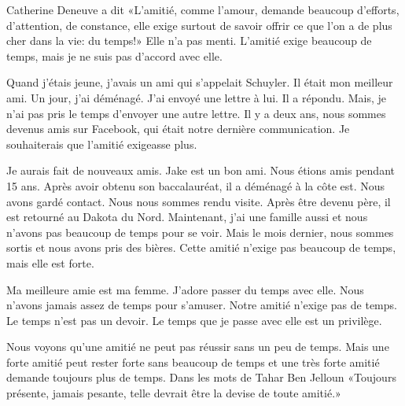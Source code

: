 \documentclass[letterpaper]{article}
\begin{document}
\doublespacing
Catherine Deneuve a dit «L'amitié, comme l'amour, demande beaucoup d'efforts, d'attention, de constance, elle exige surtout de savoir offrir ce que l'on a de plus cher dans la vie: du temps!»
Elle n'a pas menti.
L'amitié exige beaucoup de temps, mais je ne suis pas d'accord avec elle.

Quand j'étais jeune, j'avais un ami qui s'appelait Schuyler.
Il était mon meilleur ami.
Un jour, j'ai déménagé.
J'ai envoyé une lettre à lui.
Il a répondu.
Mais, je n'ai pas pris le temps d'envoyer une autre lettre.
Il y a deux ans, nous sommes devenus amis sur Facebook, qui était notre dernière communication.
Je souhaiterais que l'amitié exigeasse plus.

Je aurais fait de nouveaux amis.
Jake est un bon ami.
Nous étions amis pendant 15 ans.
Après avoir obtenu son baccalauréat, il a déménagé à la côte est.
Nous avons gardé contact.
Nous nous sommes rendu visite.
Après être devenu père, il est retourné au Dakota du Nord.
Maintenant, j'ai une famille aussi et nous n'avons pas beaucoup de temps pour se voir.
Mais le mois dernier, nous sommes sortis et nous avons pris des bières.
Cette amitié n'exige pas beaucoup de temps, mais elle est forte.

Ma meilleure amie est ma femme.
J'adore passer du temps avec elle.
Nous n'avons jamais assez de temps pour s'amuser.
Notre amitié n'exige pas de temps.
Le temps n'est pas un devoir.
Le temps que je passe avec elle est un privilège.

Nous voyons qu'une amitié ne peut pas réussir sans un peu de temps.
Mais une forte amitié peut rester forte sans beaucoup de temps et une très forte amitié demande toujours plus de temps.
Dans les mots de Tahar Ben Jelloun «Toujours présente, jamais pesante, telle devrait être la devise de toute amitié.»
\end{document}

